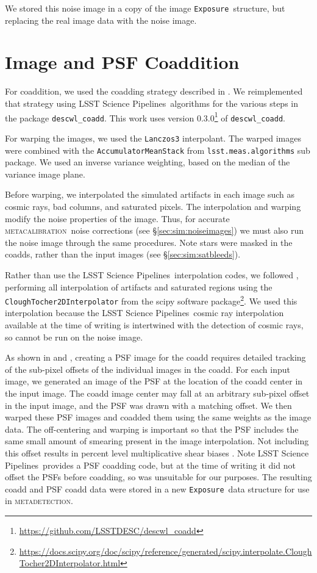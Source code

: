 \documentclass[twocolumn,twocolappendix,astrosym]{openjournal}
\newcommand{\calexp}{\texttt{Exposure}}
\newcommand{\dm}{LSST Science Pipelines}
\newcommand{\mcal}{\textsc{metacalibration}}
\newcommand{\mdet}{\textsc{metadetection}}
\begin{document}
We stored this noise image in a copy of the image \calexp\ structure, but
replacing the real image data with the noise image.

\section{Image and PSF Coaddition} \label{sec:coadding}

For coaddition, we used the coadding strategy described in
\citet{BeckerMdetCoadd}. We reimplemented that strategy using \dm\ algorithms
for the various steps in the package \texttt{descwl\_coadd}. This work uses
version 0.3.0\footnote{\url{https://github.com/LSSTDESC/descwl_coadd}} of
\texttt{descwl\_coadd}.

For warping the images, we used the \texttt{Lanczos3} interpolant. The warped
images were combined with the \texttt{AccumulatorMeanStack} from
\texttt{lsst.meas.algorithms} sub package. We used an inverse variance
weighting, based on the median of the variance image plane.

Before warping, we interpolated the simulated artifacts in each image such as
cosmic rays, bad columns, and saturated pixels.  The interpolation and warping
modify the noise properties of the image.  Thus, for accurate \mcal\ noise
corrections (see \S \ref{sec:sim:noiseimages}) we must also run the noise image
through the same procedures.  Note stars were masked in the coadds, rather than
the input images (see \S \ref{sec:sim:satbleeds}).

Rather than use the \dm\ interpolation codes, we followed \citet{BeckerMdetCoadd},
performing all interpolation of artifacts and saturated regions using the
\texttt{CloughTocher2DInterpolator} from the scipy software
package\footnote{\url{https://docs.scipy.org/doc/scipy/reference/generated/scipy.interpolate.CloughTocher2DInterpolator.html}}.
We used this interpolation because the \dm\ cosmic ray interpolation available
at the time of writing is intertwined with the detection of cosmic rays, so
cannot be run on the noise image.

As shown in \citet{ArmstrongCoadd} and \citet{BeckerMdetCoadd}, creating a PSF
image for the coadd requires detailed tracking of the sub-pixel offsets of the
individual images in the coadd. For each input image, we generated an image of
the PSF at the location of the coadd center in the input image. The coadd image
center may fall at an arbitrary sub-pixel offset in the input image, and the
PSF was drawn with a matching offset.  We then warped these PSF images and
coadded them using the same weights as the image data. The off-centering and
warping is important so that the PSF includes the same small amount of smearing
present in the image interpolation. Not including this offset results in
percent level multiplicative shear biases \citep{ArmstrongCoadd}. Note \dm\
provides a PSF coadding code, but at the time of writing it did not offset the
PSFs before coadding, so was unsuitable for our purposes. The resulting coadd
and PSF coadd data were stored in a new \calexp\ data structure for use in
\mdet.
\end{document}
